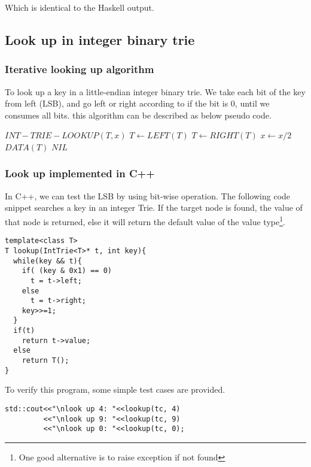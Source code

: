 \documentclass{article}
\begin{document}
Which is identical to the Haskell output.

\subsection{Look up in integer binary trie} 

\subsubsection{Iterative looking up algorithm}

To look up a key in a little-endian integer binary trie. We take each
bit of the key from left (LSB), and go left or right according to if
the bit is 0, until we consumes all bits. this algorithm can be described
as below pseudo code.

\begin{algorithmic}
\STATE $INT-TRIE-LOOKUP(T, x)$
      \STATE $T \leftarrow LEFT(T)$
    \ELSE
      \STATE $T \leftarrow RIGHT(T)$
    \ENDIF
    \STATE $x \leftarrow x/2$
  \ENDWHILE
   \RETURN $DATA(T)$
  \ELSE \RETURN $NIL$ \ENDIF
\end{algorithmic}

\subsubsection*{Look up implemented in C++}
In C++, we can test the LSB by using bit-wise operation. The following code
snippet searches a key in an integer Trie. If the target node is found, the
value of that node is returned, else it will return the default value of the
value type\footnote{One good alternative is to raise exception if not found}.
\lstset{language=C++}
\begin{lstlisting}
template<class T>
T lookup(IntTrie<T>* t, int key){
  while(key && t){
    if( (key & 0x1) == 0)
      t = t->left;
    else
      t = t->right;
    key>>=1;
  }
  if(t)
    return t->value;
  else
    return T();
}
\end{lstlisting}

To verify this program, some simple test cases are provided.

\begin{lstlisting}
std::cout<<"\nlook up 4: "<<lookup(tc, 4)
         <<"\nlook up 9: "<<lookup(tc, 9)
         <<"\nlook up 0: "<<lookup(tc, 0);
\end{lstlisting}
\end{document}
